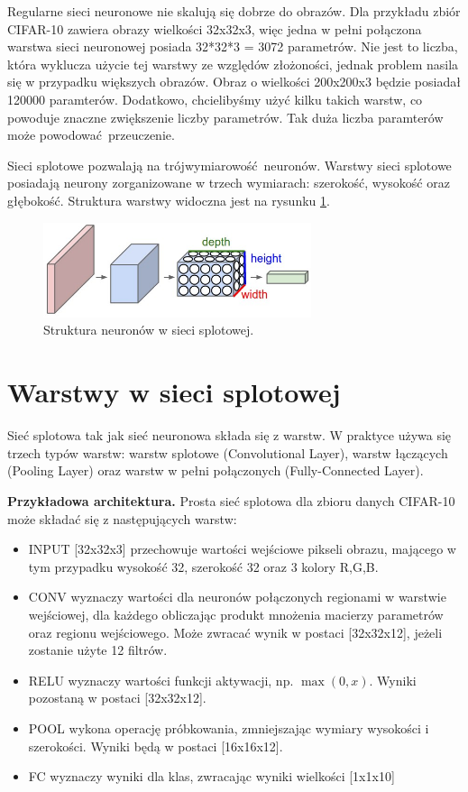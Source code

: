 \documentclass[a4paper,11pt, notitlepage, twosides, openany ]{report}
\begin{document}
	Regularne sieci neuronowe nie skalują się dobrze do obrazów. Dla przykładu zbiór CIFAR-10 zawiera obrazy wielkości 32x32x3, więc jedna w pełni połączona warstwa sieci neuronowej posiada 32*32*3 = 3072 parametrów. Nie jest to liczba, która wyklucza użycie tej warstwy ze względów złożoności, jednak problem nasila się w przypadku większych obrazów. Obraz o wielkości 200x200x3 będzie posiadał 120000 paramterów. Dodatkowo, chcielibyśmy użyć kilku takich warstw, co powoduje znaczne zwiększenie liczby parametrów. Tak duża liczba paramterów może powodować przeuczenie.

	Sieci splotowe pozwalają na trójwymiarowość neuronów. Warstwy sieci splotowe posiadają neurony zorganizowane w trzech wymiarach: szerokość, wysokość oraz głębokość. Struktura warstwy widoczna jest na rysunku \ref{convlay}.
	
	\begin{figure}[h]
		\centering
		\includegraphics[width=0.7\textwidth]{cnn.jpeg}
		\caption{Struktura neuronów w sieci splotowej.}
		\label{convlay}
	\end{figure}

	\section{Warstwy w sieci splotowej}
	Sieć splotowa tak jak sieć neuronowa składa się z warstw. W praktyce używa się trzech typów warstw: warstw splotowe (Convolutional Layer), warstw łączących (Pooling Layer) oraz warstw w pełni połączonych (Fully-Connected Layer). 

	\textbf{Przykładowa architektura.} Prosta sieć splotowa dla zbioru danych CIFAR-10 może składać się z następujących warstw:

	\begin{itemize}
		\item INPUT [32x32x3] przechowuje wartości wejściowe pikseli obrazu, mającego w tym przypadku wysokość 32, szerokość 32 oraz 3 kolory R,G,B.
		\item CONV wyznaczy wartości dla neuronów połączonych regionami w warstwie wejściowej, dla każdego obliczając produkt mnożenia macierzy parametrów oraz regionu wejściowego. Może zwracać wynik w postaci [32x32x12], jeżeli zostanie użyte 12 filtrów.
		\item RELU wyznaczy wartości funkcji aktywacji, np. $\max(0,x)$. Wyniki pozostaną w postaci [32x32x12].
		\item POOL wykona operację próbkowania, zmniejszając wymiary wysokości i szerokości. Wyniki będą w postaci [16x16x12].
		\item FC wyznaczy wyniki dla klas, zwracając wyniki wielkości [1x1x10]
	\end{itemize}
\end{document}
